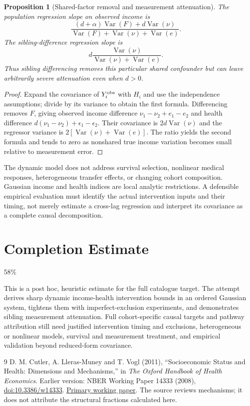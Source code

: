 \documentclass[11pt,a4paper]{article}
\newtheorem{proposition}[theorem]{Proposition}
\theoremstyle{remark}
\DeclareMathOperator{\Var}{Var}
\begin{document}
\begin{proposition}[Shared-factor removal and measurement attenuation]
The population regression slope on observed income is
\[
 \frac{(d+\alpha)\Var(F)+d\Var(\nu)}
      {\Var(F)+\Var(\nu)+\Var(e)}.
\]
The sibling-difference regression slope is
\[
 d\frac{\Var(\nu)}{\Var(\nu)+\Var(e)}.
\]
Thus sibling differencing removes this particular shared confounder but can leave arbitrarily severe attenuation even when $d>0$.
\end{proposition}
\begin{proof}
Expand the covariance of $Y_i^{\rm obs}$ with $H_i$ and use the independence assumptions; divide by its variance to obtain the first formula. Differencing removes $F$, giving observed income difference $\nu_1-\nu_2+e_1-e_2$ and health difference $d(\nu_1-\nu_2)+\epsilon_1-\epsilon_2$. Their covariance is $2d\Var(\nu)$ and the regressor variance is $2[\Var(\nu)+\Var(e)]$. The ratio yields the second formula and tends to zero as nonshared true income variation becomes small relative to measurement error.
\end{proof}

The dynamic model does not address survival selection, nonlinear medical responses, heterogeneous transfer effects, or changing cohort composition. Gaussian income and health indices are local analytic restrictions. A defensible empirical evaluation must identify the actual intervention inputs and their timing, not merely estimate a cross-lag regression and interpret its covariance as a complete causal decomposition.

\section{Completion Estimate}
58\%

This is a post hoc, heuristic estimate for the full catalogue target.
The attempt derives sharp dynamic income-health intervention bounds in an ordered Gaussian system, tightens them with imperfect-exclusion experiments, and demonstrates sibling measurement attenuation. Full cohort-specific causal targets and pathway attribution still need justified intervention timing and exclusions, heterogeneous or nonlinear models, survival and measurement treatment, and empirical validation beyond reduced-form covariance.

\begin{thebibliography}{9}
 D. M. Cutler, A. Lleras-Muney and T. Vogl (2011), ``Socioeconomic Status and Health: Dimensions and Mechanisms,'' in \emph{The Oxford Handbook of Health Economics}. Earlier version: NBER Working Paper 14333 (2008), \href{https://doi.org/10.3386/w14333}{doi:10.3386/w14333}. \href{https://www.nber.org/papers/w14333.pdf}{Primary working paper}. The source reviews mechanisms; it does not attribute the structural fractions calculated here.
\end{thebibliography}
\end{document}

